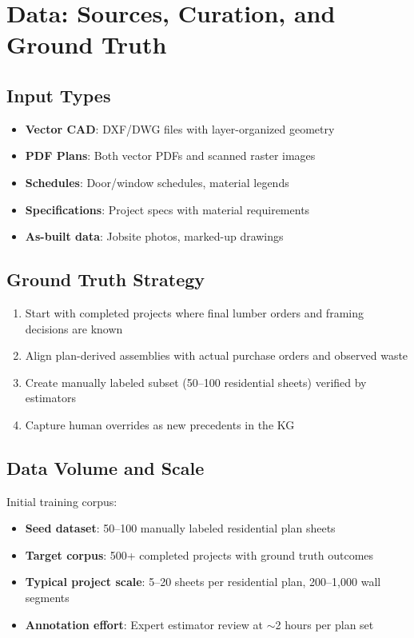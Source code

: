 
\section{Data: Sources, Curation, and Ground Truth}

\subsection{Input Types}

\begin{itemize}
  \item \textbf{Vector CAD}: DXF/DWG files with layer-organized geometry
  \item \textbf{PDF Plans}: Both vector PDFs and scanned raster images
  \item \textbf{Schedules}: Door/window schedules, material legends
  \item \textbf{Specifications}: Project specs with material requirements
  \item \textbf{As-built data}: Jobsite photos, marked-up drawings
\end{itemize}

\subsection{Ground Truth Strategy}

\begin{enumerate}
  \item Start with completed projects where final lumber orders and framing decisions are known
  \item Align plan-derived assemblies with actual purchase orders and observed waste
  \item Create manually labeled subset (50--100 residential sheets) verified by estimators
  \item Capture human overrides as new precedents in the KG
\end{enumerate}

\subsection{Data Volume and Scale}

Initial training corpus:
\begin{itemize}
  \item \textbf{Seed dataset}: 50--100 manually labeled residential plan sheets
  \item \textbf{Target corpus}: 500+ completed projects with ground truth outcomes
  \item \textbf{Typical project scale}: 5--20 sheets per residential plan, 200--1,000 wall segments
  \item \textbf{Annotation effort}: Expert estimator review at $\sim$2 hours per plan set
\end{itemize}

